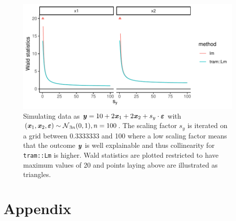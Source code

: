 \documentclass[11pt,a4paper,twoside]{book}\usepackage[]{graphicx}\usepackage[]{xcolor}
\makeatletter
\def\maxwidth{ %
  \ifdim\Gin@nat@width>\linewidth
    \linewidth
  \else
    \Gin@nat@width
  \fi
}
\newenvironment{knitrout}{}{} %
\makeatother
\begin{document}
\begin{figure}[h]%
\begin{center}
\begin{knitrout}
\color{fgcolor}
\includegraphics[width=\maxwidth]{figure/ch02_figcolllikelihood-1} 
\end{knitrout}
\end{center}
\caption{Simulating data as ${\textbf{\textit{y}}}=10+2{\textbf{\textit{x}}}_1+2{\textbf{\textit{x}}}_2+s_y\cdot {\boldsymbol{\varepsilon}}$ with $\left({\textbf{\textit{x}}}_1,{\textbf{\textit{x}}}_2,{\boldsymbol{\varepsilon}}\right)\sim\operatorname{\mathcal{N}}_{3n}(0,1),n=100$. The scaling factor $s_y$ is iterated on a grid between 0.3333333 and 100 where a low scaling factor means that the outcome ${\textbf{\textit{y}}}$ is well explainable and thus collinearity for \texttt{tram::Lm} is higher. Wald statistics are plotted restricted to have maximum values of 20 and points laying above are illustrated as triangles.}
\label{fig:colllikelihood}
\end{figure}










\appendix



\chapter{Appendix}



\end{document}
